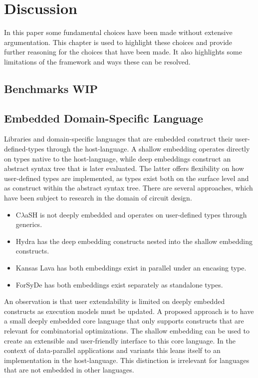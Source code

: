 \documentclass{article}
\begin{document}
\newpage

\section{Discussion}

In this paper some fundamental choices have been made without extensive argumentation.
This chapter is used to highlight these choices and provide further reasoning for the choices that have been made.
It also highlights some limitations of the framework and ways these can be resolved.

\subsection{Benchmarks WIP}



\subsection{Embedded Domain-Specific Language}

Libraries and domain-specific languages that are embedded construct their user-defined-types through the host-language.
A shallow embedding operates directly on types native to the host-language, while deep embeddings construct an abstract syntax tree that is later evaluated.
The latter offers flexibility on how user-defined types are implemented, as types exist both on the surface level and as construct within the abstract syntax tree.   
There are several approaches, which have been subject to research in the domain of circuit design.

\begin{itemize}
    \setlength\itemsep{0em}
    \item {C$\lambda$aSH} is not deeply embedded and operates on user-defined types through generics\cite{clash}. 
    \item Hydra has the deep embedding constructs nested into the shallow embedding constructs\cite{hydra}.
    \item Kansas Lava has both embeddings exist in parallel under an encasing type\cite{kansas-lava}.
    \item ForSyDe has both embeddings exist separately as standalone types\cite{forsyde}.
\end{itemize}

An observation is that user extendability is limited on deeply embedded constructs as execution models must be updated.
A proposed approach is to have a small deeply embedded core language that only supports constructs that are relevant for combinatorial optimizations\cite{shallow-and-deep}. 
The shallow embedding can be used to create an extensible and user-friendly interface to this core language.
In the context of data-parallel applications and variants this leans itself to an implementation in the host-language.
This distinction is irrelevant for languages that are not embedded in other languages.
\end{document}
